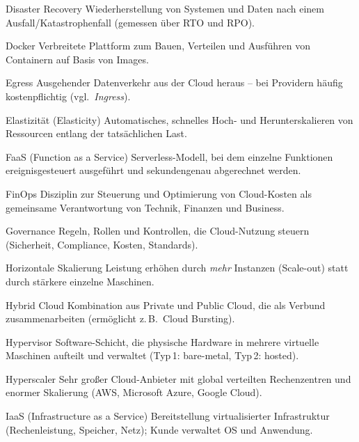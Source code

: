 \begin{glossar}
  \item[Disaster Recovery] Wiederherstellung von Systemen und Daten nach einem
        Ausfall/Katastrophenfall (gemessen über RTO und RPO).

  \item[Docker] Verbreitete Plattform zum Bauen, Verteilen und Ausführen von
        Containern auf Basis von Images.

  \item[Egress] Ausgehender Datenverkehr aus der Cloud heraus -- bei Providern
        häufig kostenpflichtig (vgl.\ \emph{Ingress}).

  \item[Elastizität (Elasticity)] Automatisches, schnelles Hoch- und
        Herunterskalieren von Ressourcen entlang der tatsächlichen Last.

  \item[FaaS (Function as a Service)] Serverless-Modell, bei dem einzelne
        Funktionen ereignisgesteuert ausgeführt und sekundengenau abgerechnet werden.

  \item[FinOps] Disziplin zur Steuerung und Optimierung von Cloud-Kosten als
        gemeinsame Verantwortung von Technik, Finanzen und Business.

  \item[Governance] Regeln, Rollen und Kontrollen, die Cloud-Nutzung steuern
        (Sicherheit, Compliance, Kosten, Standards).

  \item[Horizontale Skalierung] Leistung erhöhen durch \emph{mehr} Instanzen
        (Scale-out) statt durch stärkere einzelne Maschinen.

  \item[Hybrid Cloud] Kombination aus Private und Public Cloud, die als Verbund
        zusammenarbeiten (ermöglicht z.\,B.\ Cloud Bursting).

  \item[Hypervisor] Software-Schicht, die physische Hardware in mehrere
        virtuelle Maschinen aufteilt und verwaltet (Typ\,1: bare-metal, Typ\,2: hosted).

  \item[Hyperscaler] Sehr großer Cloud-Anbieter mit global verteilten
        Rechenzentren und enormer Skalierung (AWS, Microsoft Azure, Google Cloud).

  \item[IaaS (Infrastructure as a Service)] Bereitstellung virtualisierter
        Infrastruktur (Rechenleistung, Speicher, Netz); Kunde verwaltet OS und Anwendung.


\end{glossar}

